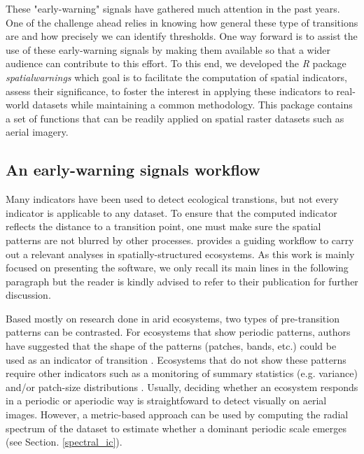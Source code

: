 \documentclass{article}
\begin{document}
These "early-warning" signals have gathered much attention in the past years. 
One of the challenge ahead relies in knowing how general these type of 
transitions are and how precisely we can identify thresholds. One way forward 
is to assist the use of these early-warning signals by making them available 
so that a wider audience can contribute to this effort. To this end, we 
developed the \emph{R} package \emph{spatialwarnings} which goal is to 
facilitate the computation of spatial indicators, assess their significance, 
to foster the interest in applying these indicators to real-world datasets 
while maintaining a common methodology. This package contains a set of 
functions that can be readily applied on spatial raster datasets such as 
aerial imagery. 

\subsection*{An early-warning signals workflow}

Many indicators have been used to detect ecological transtions, but not every 
indicator is applicable to any dataset. To ensure that the computed indicator 
reflects the distance to a transition point, one must make sure the spatial 
patterns are not blurred by other processes. \citet{kefi2014} provides a guiding 
workflow to carry out a relevant analyses in spatially-structured ecosystems. As
this work is mainly focused on presenting the software, we only recall its main 
lines in the following paragraph but the reader is kindly advised to refer to 
their publication for further discussion. 

Based mostly on research done in arid ecosystems, two types of 
pre-transition patterns can be contrasted. For ecosystems that show periodic 
patterns, authors have suggested that the shape of the patterns (patches, bands, 
etc.) could be used as an indicator of transition \citep{rietkerk2004}. 
Ecosystems that do not show these patterns require other indicators such as a 
monitoring of summary statistics (e.g. variance) and/or patch-size distributions 
\citep{kefi2011}. Usually, deciding whether an ecosystem responds in a periodic 
or aperiodic way is straightfoward to detect visually on aerial images. However, 
a metric-based approach can be used by computing the radial spectrum of the 
dataset to estimate whether a dominant periodic scale emerges (see Section. 
\ref{spectral_ic}). 

\end{document}
